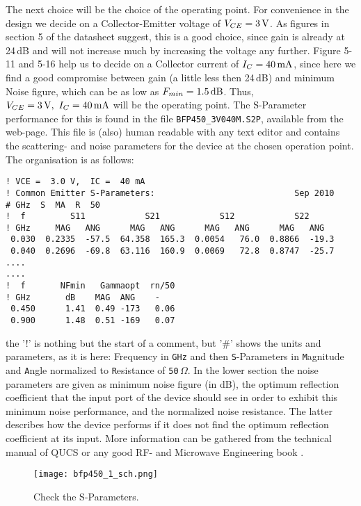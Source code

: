 The next choice will be the choice of the operating point. For
convenience in the design we decide on a Collector-Emitter voltage of
$V_{CE}=3\,\mathrm{V}$. As figures in section 5 of the datasheet
suggest, this is a good choice, since gain is already at 24\,dB and
will  not increase much by increasing the voltage any further. Figure
5-11 and 5-16 help us to decide on a Collector current of
$I_C=40\,\mathrm{mA}$, since here we find a good compromise between gain (a
little less then 24\,dB) and minimum Noise figure, which can be as low
as $F_{min}=1.5\,\mathrm{dB}$. Thus, $V_{CE}=3\,\mathrm{V},\ I_{C}=40\,\mathrm{mA}$
will be the operating point. The S-Parameter performance for this is
found in the file {\tt BFP450\_3V040M.S2P}, available from the
web-page. This file is (also) human readable with any text editor and
contains the scattering- and noise parameters for the device at the
chosen operation point. The organisation is as follows:

\begin{verbatim}
! VCE =  3.0 V,  IC =  40 mA
! Common Emitter S-Parameters:                            Sep 2010
# GHz  S  MA  R  50
!  f         S11            S21            S12            S22
! GHz     MAG   ANG      MAG   ANG      MAG   ANG      MAG   ANG
 0.030  0.2335  -57.5  64.358  165.3  0.0054   76.0  0.8866  -19.3
 0.040  0.2696  -69.8  63.116  160.9  0.0069   72.8  0.8747  -25.7
....
....
!  f       NFmin   Gammaopt  rn/50
! GHz       dB    MAG  ANG    -
 0.450      1.41  0.49 -173   0.06
 0.900      1.48  0.51 -169   0.07
\end{verbatim}

the '!' is nothing but the start of a comment, but '\#' shows the
units and parameters, as it is here: Frequency in {\tt GHz} and then
{\tt S}-Parameters in {\tt M}agnitude and {\tt A}ngle normalized to
{\tt R}esistance of {\tt 50}$\,\Omega$. In the lower section the noise
parameters are given as minimum noise figure (in dB), the optimum
reflection coefficient that the input port of the device should see in
order to exhibit this minimum noise performance, and the normalized
noise resistance. The latter describes how the device performs if
it does not find the optimum reflection coefficient at its input. More
information can be gathered from the technical manual of QUCS or any
good RF- and Microwave Engineering book \cite{qucs,col91,poz05}.

\begin{figure}
  \centering
  {\texttt{[image: bfp450\_1\_sch.png]}}
  \caption{Check the S-Parameters.}
  \label{fig:bfp450_1_sch}
\end{figure}



